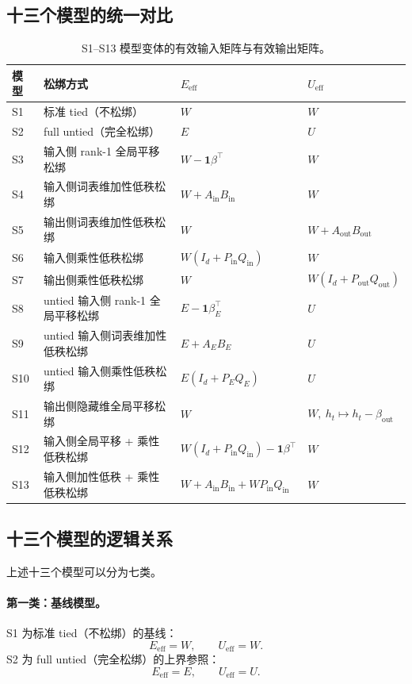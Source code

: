 \subsection{十三个模型的统一对比}

\begin{table}[htbp]
\centering
\caption{S1--S13 模型变体的有效输入矩阵与有效输出矩阵。}
\label{tab:s1_s13_variants}
\begin{tabular}{llll}
\toprule
模型 & 松绑方式 & $E_{\mathrm{eff}}$ & $U_{\mathrm{eff}}$ \\
\midrule
S1 & 标准 tied（不松绑） & $W$ & $W$ \\
S2 & full untied（完全松绑） & $E$ & $U$ \\
S3 & 输入侧 rank-1 全局平移松绑 & $W-\mathbf{1}\beta^\top$ & $W$ \\
S4 & 输入侧词表维加性低秩松绑 & $W+A_{\mathrm{in}}B_{\mathrm{in}}$ & $W$ \\
S5 & 输出侧词表维加性低秩松绑 & $W$ & $W+A_{\mathrm{out}}B_{\mathrm{out}}$ \\
S6 & 输入侧乘性低秩松绑 & $W(I_d+P_{\mathrm{in}}Q_{\mathrm{in}})$ & $W$ \\
S7 & 输出侧乘性低秩松绑 & $W$ & $W(I_d+P_{\mathrm{out}}Q_{\mathrm{out}})$ \\
S8 & untied 输入侧 rank-1 全局平移松绑 & $E-\mathbf{1}\beta_E^\top$ & $U$ \\
S9 & untied 输入侧词表维加性低秩松绑 & $E+A_EB_E$ & $U$ \\
S10 & untied 输入侧乘性低秩松绑 & $E(I_d+P_EQ_E)$ & $U$ \\
S11 & 输出侧隐藏维全局平移松绑 & $W$ & $W,\ h_t\mapsto h_t-\beta_{\mathrm{out}}$ \\
S12 & 输入侧全局平移 + 乘性低秩松绑 & $W(I_d+P_{\mathrm{in}}Q_{\mathrm{in}})-\mathbf{1}\beta^\top$ & $W$ \\
S13 & 输入侧加性低秩 + 乘性低秩松绑 & $W+A_{\mathrm{in}}B_{\mathrm{in}}+WP_{\mathrm{in}}Q_{\mathrm{in}}$ & $W$ \\
\bottomrule
\end{tabular}
\end{table}

\subsection{十三个模型的逻辑关系}

上述十三个模型可以分为七类。

\paragraph{第一类：基线模型。}
S1 为标准 tied（不松绑）的基线：
\begin{equation}
    E_{\mathrm{eff}} = W, \qquad
    U_{\mathrm{eff}} = W.
\end{equation}
S2 为 full untied（完全松绑）的上界参照：
\begin{equation}
    E_{\mathrm{eff}} = E, \qquad
    U_{\mathrm{eff}} = U.
\end{equation}

